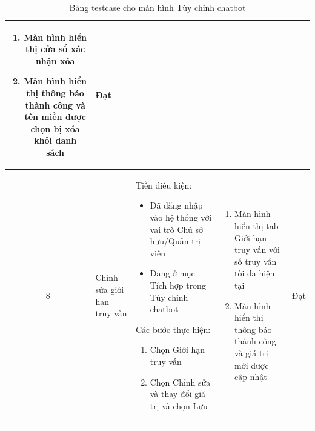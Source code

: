 \begin{longtable}{|c|m{2.5cm}|m{5.5cm}|m{4.5cm}|c|}
\begin{enumerate}[label=\arabic*.]
    \item Màn hình hiển thị cửa sổ xác nhận xóa
    \item Màn hình hiển thị thông báo thành công và tên miền được chọn bị xóa khỏi danh sách
\end{enumerate}  & Đạt \\
\hline
8 & 
Chỉnh sửa giới hạn truy vấn & 
Tiền điều kiện:
\begin{itemize}
    \item Đã đăng nhập vào hệ thống với vai trò Chủ sở hữu/Quản trị viên
    \item Đang ở mục Tích hợp trong Tùy chỉnh chatbot
\end{itemize}
Các bước thực hiện: 
\begin{enumerate}[label=\arabic*.]
    \item Chọn Giới hạn truy vấn
    \item Chọn Chỉnh sửa và thay đổi giá trị và chọn Lưu
\end{enumerate}
& 
\begin{enumerate}[label=\arabic*.]
    \item Màn hình hiển thị tab Giới hạn truy vấn với số truy vấn tối đa hiện tại
    \item Màn hình hiển thị thông báo thành công và giá trị mới được cập nhật
\end{enumerate}  & Đạt \\
\hline
\caption{Bảng testcase cho màn hình Tùy chỉnh chatbot}
\end{longtable}